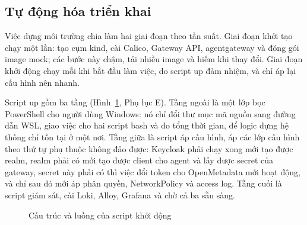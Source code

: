 \documentclass[a4paper]{article}
\begin{document}
\subsection{Tự động hóa triển khai}\label{sec:auto}

Việc dựng môi trường chia làm hai giai đoạn theo tần suất. Giai đoạn khởi tạo chạy một lần: tạo cụm kind, cài Calico, Gateway API, agentgateway và đóng gói image mock; các bước này chậm, tải nhiều image và hiếm khi thay đổi. Giai đoạn khởi động chạy mỗi khi bắt đầu làm việc, do script up đảm nhiệm, và chỉ áp lại cấu hình nên nhanh.

Script up gồm ba tầng (Hình~\ref{fig:up}, Phụ lục E). Tầng ngoài là một lớp bọc PowerShell cho người dùng Windows: nó chỉ đổi thư mục mã nguồn sang đường dẫn WSL, giao việc cho hai script bash và đo tổng thời gian, để logic dựng hệ thống chỉ tồn tại ở một nơi. Tầng giữa là script áp cấu hình, áp các lớp cấu hình theo thứ tự phụ thuộc không đảo được: Keycloak phải chạy xong mới tạo được realm, realm phải có mới tạo được client cho agent và lấy được secret của gateway, secret này phải có thì việc đổi token cho OpenMetadata mới hoạt động, và chỉ sau đó mới áp phân quyền, NetworkPolicy và access log. Tầng cuối là script giám sát, cài Loki, Alloy, Grafana và chờ cả ba sẵn sàng.

\begin{figure}[htbp]\centering
{}
\caption{Cấu trúc và luồng của script khởi động}\label{fig:up}\end{figure}
\end{document}
